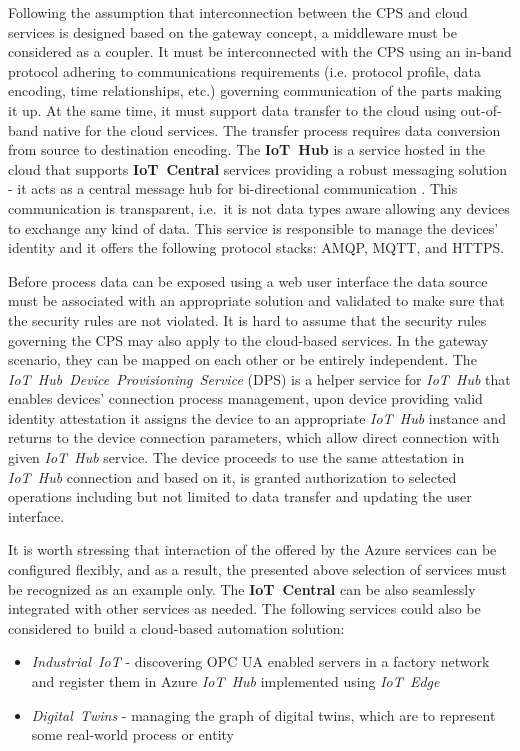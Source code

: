 \documentclass[runningheads]{llncs}
\begin{document}
Following the assumption that interconnection between the CPS and cloud services is designed based on the gateway concept, a middleware must be considered as a coupler. It must be interconnected with the CPS using an in-band protocol adhering to communications requirements (i.e. protocol profile, data encoding, time relationships, etc.) governing communication of the parts making it up. At the same time, it must support data transfer to the cloud using out-of-band native for the cloud services. The transfer process requires data conversion from source to destination encoding. The \textbf{IoT\ Hub} is a service hosted in the cloud that supports \textbf{IoT\ Central} services providing a robust messaging solution - it acts as a central message hub for bi-directional communication \cite{MicrosoftAzureIoTPlatform}. This communication is transparent, i.e.~it is not data types aware allowing any devices to exchange any kind of data. This service is responsible to manage the devices' identity and it offers the following protocol stacks: AMQP, MQTT, and HTTPS.

Before process data can be exposed using a web user interface the data source must be associated with an appropriate solution and validated to make sure that the security rules are not violated. It is hard to assume that the security rules governing the CPS may also apply to the cloud-based services. In the gateway scenario, they can be mapped on each other or be entirely independent. The \emph{IoT\ Hub\ Device\ Provisioning\ Service} (DPS) is a helper service for \emph{IoT\ Hub} that enables devices' connection process management, upon device providing valid identity attestation it assigns the device to an appropriate \emph{IoT\ Hub} instance and returns to the device connection parameters, which allow direct connection with given \emph{IoT\ Hub} service. The device proceeds to use the same attestation in \emph{IoT\ Hub} connection and based on it, is granted authorization to selected operations including but not limited to data transfer and updating the user interface.

It is worth stressing that interaction of the offered by the Azure services can be configured flexibly, and as a result, the presented above selection of services must be recognized as an example only. The \textbf{IoT\ Central} can be also seamlessly integrated with other services as needed. The following services could also be considered to build a cloud-based automation solution:

\begin{itemize}
      \item \emph{Industrial\ IoT} - discovering OPC UA enabled servers in a factory network and register them in Azure \emph{IoT\ Hub} implemented using \emph{IoT\ Edge}
      \item \emph{Digital\ Twins} - managing the graph of digital twins, which are to represent some real-world process or entity
\end{itemize}
\end{document}

